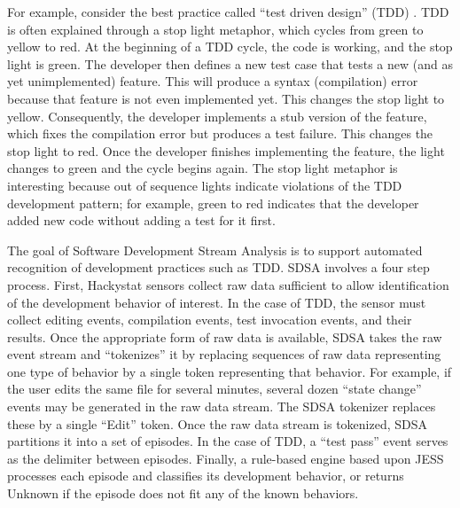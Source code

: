 For example, consider the best practice called ``test driven design'' (TDD)
\cite{Beck03}.  TDD is often explained through a stop light metaphor, which
cycles from green to yellow to red.  At the beginning of a TDD cycle, the
code is working, and the stop light is green.  The developer then defines a
new test case that tests a new (and as yet unimplemented) feature.  This
will produce a syntax (compilation) error because that feature is not even
implemented yet.  This changes the stop light to yellow.  Consequently, the
developer implements a stub version of the feature, which fixes the
compilation error but produces a test failure.  This changes the stop light
to red. Once the developer finishes implementing the feature, the light
changes to green and the cycle begins again.  The stop light metaphor is
interesting because out of sequence lights indicate violations of the TDD
development pattern; for example, green to red indicates that the developer
added new code without adding a test for it first.

The goal of Software Development Stream Analysis is to support automated
recognition of development practices such as TDD.  SDSA involves a four
step process. First, Hackystat sensors collect raw data sufficient to
allow identification of the development behavior of interest. In the case
of TDD, the sensor must collect editing events,
compilation events, test invocation events, and their results.  Once the
appropriate form of raw data is available, SDSA takes the raw event stream
and ``tokenizes'' it by replacing sequences of raw data representing one
type of behavior by a single token representing that behavior. For example,
if the user edits the same file for several minutes, several dozen ``state
change'' events may be generated in the raw data stream. The SDSA tokenizer
replaces these by a single ``Edit'' token. Once the raw data stream is
tokenized, SDSA partitions it into a set of episodes.  In the case of TDD,
a ``test pass'' event serves as the delimiter between episodes.  Finally, a
rule-based engine based upon JESS \cite{Friedman-Hill:03} processes each
episode and classifies its development behavior, or returns Unknown if the
episode does not fit any of the known behaviors.

